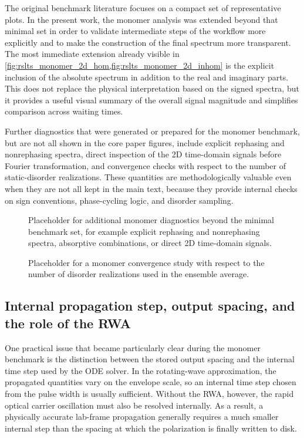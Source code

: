 The original benchmark literature focuses on a compact set of representative
plots.
In the present work, the monomer analysis was extended beyond that minimal set in
order to validate intermediate steps of the workflow more explicitly and to make
the construction of the final spectrum more transparent.
The most immediate extension already visible in
\autoref{fig:rslts_monomer_2d_hom,fig:rslts_monomer_2d_inhom} is the
explicit inclusion of the absolute spectrum in addition to the real and imaginary
parts.
This does not replace the physical interpretation based on the signed spectra,
but it provides a useful visual summary of the overall signal magnitude and
simplifies comparison across waiting times.

Further diagnostics that were generated or prepared for the monomer benchmark,
but are not all shown in the core paper figures, include explicit rephasing and
nonrephasing spectra, direct inspection of the 2D time-domain signals before
Fourier transformation, and convergence checks with respect to the number of
static-disorder realizations.
These quantities are methodologically valuable even when they are not all kept in
the main text, because they provide internal checks on sign conventions,
phase-cycling logic, and disorder sampling.

\begin{figure}[htbp]
    \centering
    \caption{Placeholder for additional monomer diagnostics beyond the minimal
    benchmark set, for example explicit rephasing and nonrephasing spectra,
    absorptive combinations, or direct 2D time-domain signals.}
    \label{fig:rslts_monomer_extra_diagnostics}
\end{figure}

\begin{figure}[htbp]
    \centering
    \caption{Placeholder for a monomer convergence study with respect to the
    number of disorder realizations used in the ensemble average.}
    \label{fig:rslts_monomer_n_inhomogen_dependence}
\end{figure}

\subsection{Internal propagation step, output spacing, and the role of the RWA}

One practical issue that became particularly clear during the monomer benchmark
is the distinction between the stored output spacing and the internal time step
used by the ODE solver.
In the rotating-wave approximation, the propagated quantities vary on the
envelope scale, so an internal time step chosen from the pulse width is usually
sufficient.
Without the RWA, however, the rapid optical carrier oscillation must also be
resolved internally.
As a result, a physically accurate lab-frame propagation generally requires a
much smaller internal step than the spacing at which the polarization is finally
written to disk.

